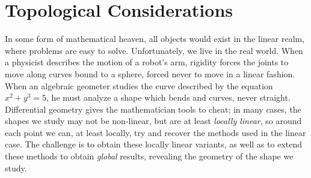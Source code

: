 \begin{comment}
In our case, we wish to specialize the study of topological curves to curves with a well defined tangent line. In this case, curves like $c(t) = |t|^{1/2}$ will not have the properties we wish to study, since the curve has no tangent line at zero. We define a differentiable curve of order $C^k$  in terms of parameterizations $c: I \to \mathbf{R}$ which are $C^k$, in the sense that the first $k$ derivatives of $c^1$ and $c^2$ are continuous. Of course, we identify these parameterizations if they have a reparameterization which is also $C^k$, and this gives us the general definition we desire. The term {\bf smooth} is often reserved for the differentiable curves of order $C^\infty$.

\begin{example}
    The {\bf Spiral of Archimedes} can be thought of as the smooth curve defined in polar coordinates by the equation $r = \theta$, which also has the parameterization $c: (0,\infty) \to \mathbf{R}^2$ defined by $c(t) = (t \cos t, t \sin t)$. One can synthetically find the tangent line at a point $P$ on the spiral of archimedes by considering a point $Q$ on $OP$ a unit length from $OQ$, rotating $P$ by a right angle anticlockwise to form the point $R$, and then considering the line through $P$ parallel to $QR$.
\end{example}
\end{comment}

\chapter{Topological Considerations}

In some form of mathematical heaven, all objects would exist in the linear realm, where problems are easy to solve. Unfortunately, we live in the real world.  When a physicist describes the motion of a robot's arm, rigidity forces the joints to move along curves bound to a sphere, forced never to move in a linear fashion. When an algebraic geometer studies the curve described by the equation $x^2 + y^3 = 5$, he must analyze a shape which bends and curves, never straight. Differential geometry gives the mathematician tools to cheat; in many cases, the shapes we study may not be non-linear, but are at least {\it locally linear}, so around each point we can, at least locally, try and recover the methods used in the linear case. The challenge is to obtain these locally linear variants, as well as to extend these methods to obtain \emph{global} results, revealing the geometry of the shape we study.

